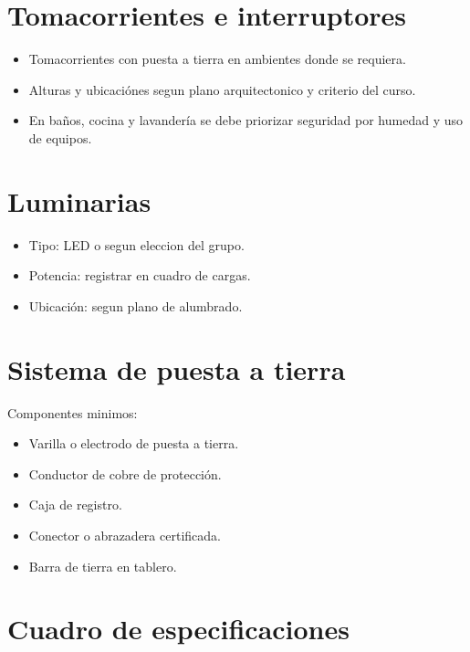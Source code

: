 \section{Tomacorrientes e interruptores}

\begin{itemize}
  \item Tomacorrientes con puesta a tierra en ambientes donde se requiera.
  \item Alturas y ubicaciónes segun plano arquitectonico y criterio del curso.
  \item En baños, cocina y lavandería se debe priorizar seguridad por humedad y uso de equipos.
\end{itemize}

\section{Luminarias}

\begin{itemize}
  \item Tipo: LED o segun eleccion del grupo.
  \item Potencia: registrar en cuadro de cargas.
  \item Ubicación: segun plano de alumbrado.
\end{itemize}

\section{Sistema de puesta a tierra}

Componentes minimos:

\begin{itemize}
  \item Varilla o electrodo de puesta a tierra.
  \item Conductor de cobre de protección.
  \item Caja de registro.
  \item Conector o abrazadera certificada.
  \item Barra de tierra en tablero.
\end{itemize}

\section{Cuadro de especificaciones}

